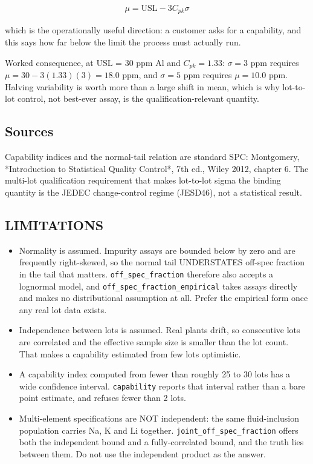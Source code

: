 \documentclass[10pt,a4paper,twoside]{report}
\begin{document}
\begin{equation*}
\begin{gathered}
\mu = \mathrm{USL} - 3 C_{pk} \sigma
\end{gathered}
\end{equation*}

which is the operationally useful direction: a customer asks for a capability, and this says how far below the limit the process must actually run.

Worked consequence, at USL = 30 ppm Al and $C_{pk} = 1.33$: $\sigma = 3$ ppm requires $\mu = 30 - 3(1.33)(3) = 18.0$ ppm, and $\sigma = 5$ ppm requires $\mu = 10.0$ ppm. Halving variability is worth more than a large shift in mean, which is why lot-to-lot control, not best-ever assay, is the qualification-relevant quantity.

\subsection*{Sources}

Capability indices and the normal-tail relation are standard SPC: Montgomery, *Introduction to Statistical Quality Control*, 7th ed., Wiley 2012, chapter 6. The multi-lot qualification requirement that makes lot-to-lot sigma the binding quantity is the JEDEC change-control regime (JESD46), not a statistical result.

\subsection*{LIMITATIONS}

\begin{itemize}
\item Normality is assumed. Impurity assays are bounded below by zero and are frequently right-skewed, so the normal tail UNDERSTATES off-spec fraction in the tail that matters. \texttt{off\_spec\_fraction} therefore also accepts a lognormal model, and \texttt{off\_spec\_fraction\_empirical} takes assays directly and makes no distributional assumption at all. Prefer the empirical form once any real lot data exists.
\item Independence between lots is assumed. Real plants drift, so consecutive lots are correlated and the effective sample size is smaller than the lot count. That makes a capability estimated from few lots optimistic.
\item A capability index computed from fewer than roughly 25 to 30 lots has a wide confidence interval. \texttt{capability} reports that interval rather than a bare point estimate, and refuses fewer than 2 lots.
\item Multi-element specifications are NOT independent: the same fluid-inclusion population carries Na, K and Li together. \texttt{joint\_off\_spec\_fraction} offers both the independent bound and a fully-correlated bound, and the truth lies between them. Do not use the independent product as the answer.
\end{itemize}
\end{document}
